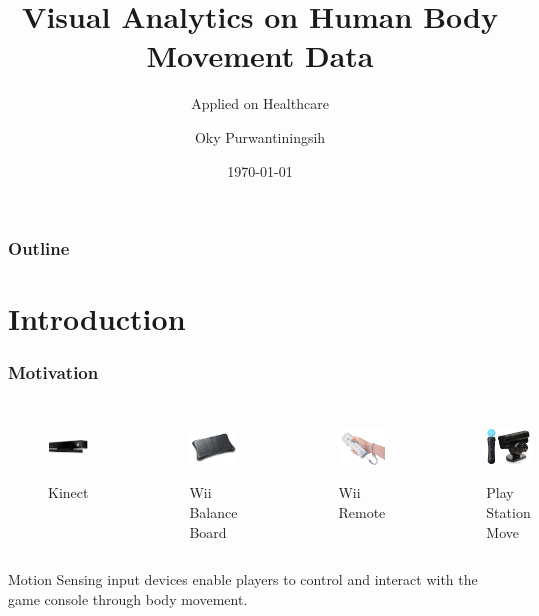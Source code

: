 \documentclass{beamer}
\title{Visual Analytics on Human Body Movement Data }
\subtitle{Applied on Healthcare}
\author{Oky Purwantiningsih}
\institute{IT4BI Master Thesis}
\date{\today}
\begin{document}
\begin{frame}
\titlepage
\end{frame}

\begin{frame}
\label{contents}
\frametitle{Outline}
\tableofcontents
\end{frame}

\section{Introduction}
\begin{frame}
\frametitle{Motivation}
\begin{columns}
\centering
\begin{figure}
\includegraphics[width=3.5cm,height=1.7cm]{images/kinect.jpg}
\caption{Kinect}
\end{figure}
\begin{figure}
\includegraphics[width=3.5cm,height=1.7cm]{images/wii_balance_board.jpg}
\caption{Wii Balance Board}
\end{figure}

\centering
\begin{figure}
\includegraphics[width=3.5cm,height=1.7cm]{images/wii_remote.jpg}
\caption{Wii Remote}
\end{figure}
\begin{figure}
\includegraphics[width=3.5cm,height=1.7cm]{images/play_station_move.jpg}
\caption{Play Station Move}
\end{figure}

\end{columns}
Motion Sensing input devices enable players to control and interact with the game console through body movement.
\end{frame}
\end{document}
